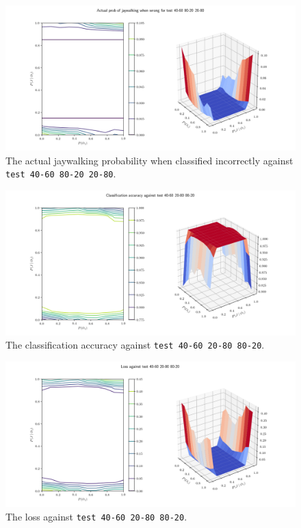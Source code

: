 \documentclass[paper=a4paper]{report}
\newcommand{\code}{\texttt}
\begin{document}
\begin{figure}[h]
    \centering
    \centerline{\includegraphics[scale=0.55]{test_40-60_80-20_20-80_jay_prob.png}}
    \caption[]{The actual jaywalking probability when classified incorrectly against \code{test 40-60 80-20 20-80}.}
    \label{fig:test_40-60_80-20_20-80_jay_prob_plot}
\end{figure}

% 
% 

\begin{figure}[h]
    \centering
    \centerline{\includegraphics[scale=0.55]{test_40-60_20-80_80-20_accuracy.png}}
    \caption[]{The classification accuracy against \code{test 40-60 20-80 80-20}.}
    \label{fig:test_40-60_20-80_80-20_accuracy_plot}
\end{figure}

\begin{figure}[h]
    \centering
    \centerline{\includegraphics[scale=0.55]{test_40-60_20-80_80-20_loss.png}}
    \caption[]{The loss against \code{test 40-60 20-80 80-20}.}
    \label{fig:test_40-60_20-80_80-20_loss_plot}
\end{figure}
\end{document}
